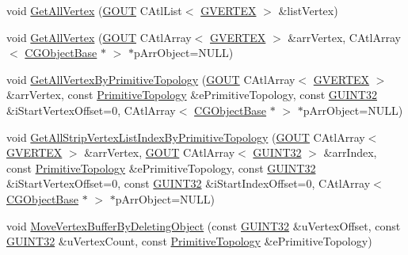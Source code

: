 \begin{DoxyCompactItemize}
\item 
void \hyperlink{class_c_g_object_manager_ae79fb2ae9538f5b80e564591418c2a03}{Get\+All\+Vertex} (\hyperlink{_g_types_8h_a0858ec221262e635612871d70ca233ad}{G\+O\+U\+T} C\+Atl\+List$<$ \hyperlink{struct_g_v_e_r_t_e_x}{G\+V\+E\+R\+T\+E\+X} $>$ \&list\+Vertex)
\item 
void \hyperlink{class_c_g_object_manager_a63c6731fd87a6778b229d510ec64f17f}{Get\+All\+Vertex} (\hyperlink{_g_types_8h_a0858ec221262e635612871d70ca233ad}{G\+O\+U\+T} C\+Atl\+Array$<$ \hyperlink{struct_g_v_e_r_t_e_x}{G\+V\+E\+R\+T\+E\+X} $>$ \&arr\+Vertex, C\+Atl\+Array$<$ \hyperlink{class_c_g_object_base}{C\+G\+Object\+Base} $\ast$ $>$ $\ast$p\+Arr\+Object=N\+U\+L\+L)
\item 
void \hyperlink{class_c_g_object_manager_a03a77de7b5ed9db87406f194b8d26103}{Get\+All\+Vertex\+By\+Primitive\+Topology} (\hyperlink{_g_types_8h_a0858ec221262e635612871d70ca233ad}{G\+O\+U\+T} C\+Atl\+Array$<$ \hyperlink{struct_g_v_e_r_t_e_x}{G\+V\+E\+R\+T\+E\+X} $>$ \&arr\+Vertex, const \hyperlink{_g_types_8h_a940e3da6a9b57aae3de0b050e2a7af5e}{Primitive\+Topology} \&e\+Primitive\+Topology, const \hyperlink{_g_types_8h_a2e1a1c77d1349057202e2f34e071019c}{G\+U\+I\+N\+T32} \&i\+Start\+Vertex\+Offset=0, C\+Atl\+Array$<$ \hyperlink{class_c_g_object_base}{C\+G\+Object\+Base} $\ast$ $>$ $\ast$p\+Arr\+Object=N\+U\+L\+L)
\item 
void \hyperlink{class_c_g_object_manager_a9d90f00c8245946efa4358f3f9ea7081}{Get\+All\+Strip\+Vertex\+List\+Index\+By\+Primitive\+Topology} (\hyperlink{_g_types_8h_a0858ec221262e635612871d70ca233ad}{G\+O\+U\+T} C\+Atl\+Array$<$ \hyperlink{struct_g_v_e_r_t_e_x}{G\+V\+E\+R\+T\+E\+X} $>$ \&arr\+Vertex, \hyperlink{_g_types_8h_a0858ec221262e635612871d70ca233ad}{G\+O\+U\+T} C\+Atl\+Array$<$ \hyperlink{_g_types_8h_a2e1a1c77d1349057202e2f34e071019c}{G\+U\+I\+N\+T32} $>$ \&arr\+Index, const \hyperlink{_g_types_8h_a940e3da6a9b57aae3de0b050e2a7af5e}{Primitive\+Topology} \&e\+Primitive\+Topology, const \hyperlink{_g_types_8h_a2e1a1c77d1349057202e2f34e071019c}{G\+U\+I\+N\+T32} \&i\+Start\+Vertex\+Offset=0, const \hyperlink{_g_types_8h_a2e1a1c77d1349057202e2f34e071019c}{G\+U\+I\+N\+T32} \&i\+Start\+Index\+Offset=0, C\+Atl\+Array$<$ \hyperlink{class_c_g_object_base}{C\+G\+Object\+Base} $\ast$ $>$ $\ast$p\+Arr\+Object=N\+U\+L\+L)
\item 
void \hyperlink{class_c_g_object_manager_a1aab4644036e8c519a55efe62d53e6c7}{Move\+Vertex\+Buffer\+By\+Deleting\+Object} (const \hyperlink{_g_types_8h_a2e1a1c77d1349057202e2f34e071019c}{G\+U\+I\+N\+T32} \&u\+Vertex\+Offset, const \hyperlink{_g_types_8h_a2e1a1c77d1349057202e2f34e071019c}{G\+U\+I\+N\+T32} \&u\+Vertex\+Count, const \hyperlink{_g_types_8h_a940e3da6a9b57aae3de0b050e2a7af5e}{Primitive\+Topology} \&e\+Primitive\+Topology)

\end{DoxyCompactItemize}
